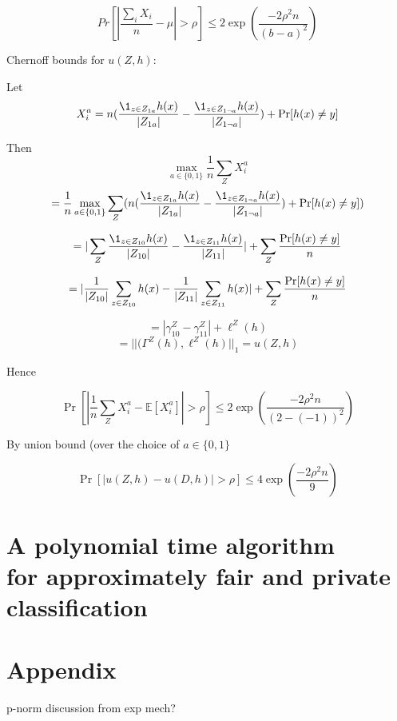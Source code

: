 $$Pr[|\frac{\sum_i X_i}{n} - \mu| > \rho] \leq 2\exp(\frac{-2\rho^2n}{(b-a)^2})$$

Chernoff bounds for $u(Z,h)$:

Let $$X_i^a = n(\frac{\1_{z\in Z_{1a}}h(x)}{|Z_{1a}|} - \frac{\1_{z\in
Z_{1\neg a}}h(x)}{|Z_{1 \neg a}|} ) + \Pr[h(x) \neq y]$$

Then $$\max_{a\in \{0,1\}}\frac{1}{n} \sum_Z X_i^a$$
$$ =\frac{1}{n}
\max_{a\in \{0,1\}} \sum_Z (n(\frac{\1_{z\in Z_{1a}}h(x)}{|Z_{1a}|} -
\frac{\1_{z\in Z_{1\neg a}}h(x)}{|Z_{1 \neg a}|} ) + \Pr[h(x) \neq y])$$

$$= |\sum_Z \frac{\1_{z\in \z{10}}h(x)}{|\z{10}|} - \frac{\1_{z\in
Z_{11}}h(x)}{|Z_{11}|}| +  \sum_Z \frac{\Pr[h(x) \neq y] }{n}$$

$$= |\frac{1}{|Z_{10}|} \sum_{z\in Z_{10}} h(x) - \frac{1}{|Z_{11}|} \sum_{z\in Z_{11}} h(x)| +  \sum_Z \frac{\Pr[h(x) \neq y] }{n}$$

$$=|\gamma_{10}^Z - \gamma_{11}^Z| + \ell^Z(h) $$
$$=||(\Gamma^Z(h), \ell^Z(h)||_{1} = u(Z,h)$$

Hence

$$\Pr[|\frac{1}{n} \sum_Z X_i^a - \mathbb{E}[X_i^a]| > \rho] \leq 2\exp(\frac{-2\rho^2n}{(2-(-1))^2})$$

By union bound (over the choice of $a \in \{0,1\}$

$$\Pr[|u(Z,h) - u(D,h)| > \rho] \leq 4\exp(\frac{-2\rho^2n}{9})$$


\section{A polynomial time algorithm \\for approximately fair and private classification}

\section{Appendix}
p-norm discussion from exp mech?
